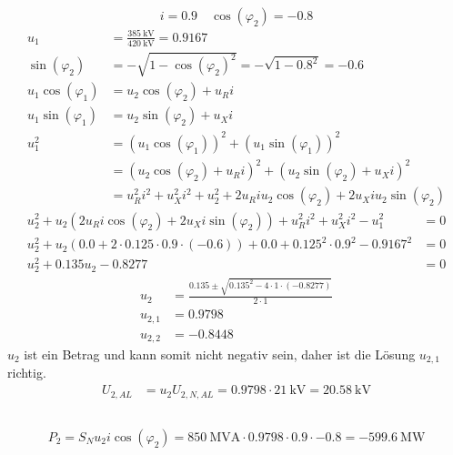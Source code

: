 \documentclass[11pt,a4paper]{scrartcl}
\newcommand{\mybr}[1]{\left(#1\right)}
\newcommand{\0}{_{\mybr{0}}}
\newcommand{\1}{_{\mybr{1}}}
\newcommand{\2}{_{\mybr{2}}}
\newcommand{\USA}{U_{2,AL}}
\newcommand{\USNA}{U_{2,N,AL}}
\newcommand{\ce}{\cos\mybr{\varphi_1}}
\newcommand{\se}{\sin\mybr{\varphi_1}}
\newcommand{\cz}{\cos\mybr{\varphi_2}}
\newcommand{\sz}{\sin\mybr{\varphi_2}}
\begin{document}
\subsection{}
\begin{equation}
i=\num{0.9}\quad \cz=-0.8
\end{equation}
\begin{align}
u_1&=\frac{\SI{385}{\kilo\volt}}{\SI{420}{\kilo\volt}}=\num{0.9167}\\
\sz&=-\sqrt{1-\cz^2}=-\sqrt{1-{\num{0.8}}^2}=\num{-0.6}\\
u_1\ce&=u_2\cz+u_R i\\
u_1\se&=u_2\sz+u_X i\\
u_1^2&=\mybr{u_1\ce}^2+\mybr{u_1\se}^2\\
&=\mybr{u_2\cz+u_R i}^2+\mybr{u_2\sz+u_X i}^2\\
&=u_R^2i^2+u_X^2i^2+u_2^2+2u_R i u_2 \cz+2u_X i u_2\sz
\end{align}
\begin{align}
u_2^2+u_2\mybr{2u_R i \cz+2u_X i \sz}+u_R^2 i^2 + u_X^2 i^2 - u_1^2 &= 0\\
u_2^2+u_2\mybr{\num{0.0}+2\cdot\num{0.125}\cdot\num{0.9}\cdot\mybr{\num{-0.6}}}+\num{0.0}+\num{0.125}^2\cdot\num{0.9}^2-\num{0.9167}^2 &=0\\
u_2^2+\num{0.135}u_2-\num{0.8277}&=0
\end{align}
\begin{align}
u_2&=\frac{\num{0.135}\pm\sqrt{\num{0.135}^2-4\cdot1\cdot\mybr{\num{-0.8277}}}}{2\cdot1}\\
u_{2,1}&=\num{0.9798}\\
u_{2,2}&=\num{-0.8448}
\end{align}
$u_2$ ist ein Betrag und kann somit nicht negativ sein, daher ist die Lösung $u_{2,1}$ richtig.
\begin{align}
\USA&=u_2\USNA=\num{0.9798}\cdot\SI{21}{\kilo\volt}=\SI{20.58}{\kilo\volt}
\end{align}

\subsection{}
\begin{equation}
P_2=S_N u_2 i \cz=\SI{850}{\mega\volt\ampere}\cdot\num{0.9798}\cdot\num{0.9}\cdot\num{-0.8}=\SI{-599.6}{\mega\watt}
\end{equation}

\clearpage
\end{document}

